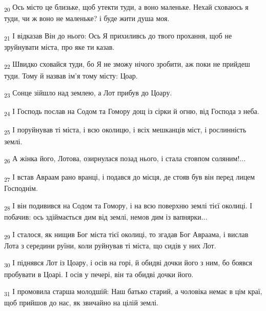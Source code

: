 \begin{tcolorbox}
\textsubscript{20} Ось місто це близьке, щоб утекти туди, а воно маленьке. Нехай сховаюсь я туди, чи ж воно не маленьке? і буде жити душа моя.
\end{tcolorbox}
\begin{tcolorbox}
\textsubscript{21} І відказав Він до нього: Ось Я прихиливсь до твого прохання, щоб не зруйнувати міста, про яке ти казав.
\end{tcolorbox}
\begin{tcolorbox}
\textsubscript{22} Швидко сховайся туди, бо Я не зможу нічого зробити, аж поки не прийдеш туди. Тому й назвав ім'я тому місту: Цоар.
\end{tcolorbox}
\begin{tcolorbox}
\textsubscript{23} Сонце зійшло над землею, а Лот прибув до Цоару.
\end{tcolorbox}
\begin{tcolorbox}
\textsubscript{24} І Господь послав на Содом та Гомору дощ із сірки й огню, від Господа з неба.
\end{tcolorbox}
\begin{tcolorbox}
\textsubscript{25} І поруйнував ті міста, і всю околицю, і всіх мешканців міст, і рослинність землі.
\end{tcolorbox}
\begin{tcolorbox}
\textsubscript{26} А жінка його, Лотова, озирнулася позад нього, і стала стовпом соляним!...
\end{tcolorbox}
\begin{tcolorbox}
\textsubscript{27} І встав Авраам рано вранці, і подався до місця, де стояв був він перед лицем Господнім.
\end{tcolorbox}
\begin{tcolorbox}
\textsubscript{28} І він подивився на Содом та Гомору, і на всю поверхню землі тієї околиці. І побачив: ось здіймається дим від землі, немов дим із вапнярки...
\end{tcolorbox}
\begin{tcolorbox}
\textsubscript{29} І сталося, як нищив Бог міста тієї околиці, то згадав Бог Авраама, і вислав Лота з середини руїни, коли руйнував ті міста, що сидів у них Лот.
\end{tcolorbox}
\begin{tcolorbox}
\textsubscript{30} І піднявся Лот із Цоару, і осів на горі, й обидві дочки його з ним, бо боявся пробувати в Цоарі. І осів у печері, він та обидві дочки його.
\end{tcolorbox}
\begin{tcolorbox}
\textsubscript{31} І промовила старша молодшій: Наш батько старий, а чоловіка немає в цім краї, щоб прийшов до нас, як звичайно на цілій землі.
\end{tcolorbox}
